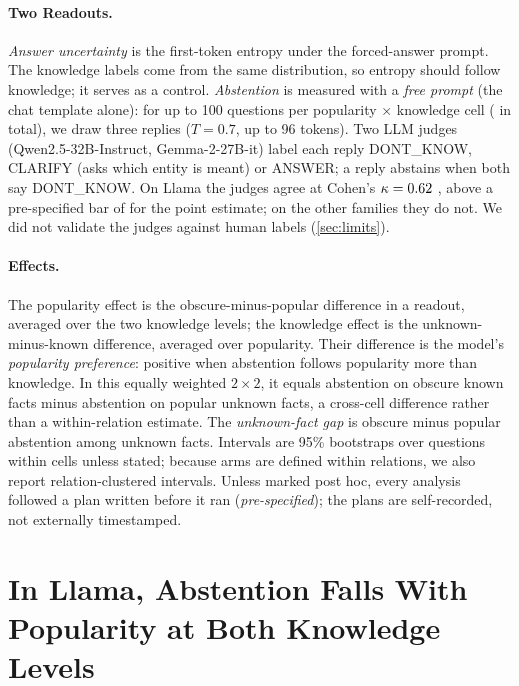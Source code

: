 \documentclass[manuscript,screen,review,anonymous,nonacm]{acmart}
\begin{document}
\paragraph{Two Readouts.} \emph{Answer uncertainty} is the first-token entropy under the forced-answer prompt. The knowledge labels come from the same distribution, so entropy should follow knowledge; it serves as a control. \emph{Abstention} is measured with a \emph{free prompt} (the chat template alone): for up to 100 questions per popularity $\times$ knowledge cell (\hmLlamaItems{} in total), we draw three replies ($T=0.7$, up to 96 tokens). Two LLM judges (Qwen2.5-32B-Instruct, Gemma-2-27B-it) label each reply DONT\_KNOW, CLARIFY (asks which entity is meant) or ANSWER; a reply abstains when both say DONT\_KNOW. On Llama the judges agree at Cohen's $\kappa=0.62$ \lkKappaCI, above a pre-specified bar of \kappaBar{} for the point estimate; on the other families they do not. We did not validate the judges against human labels (\cref{sec:limits}).

\paragraph{Effects.} The popularity effect is the obscure-minus-popular difference in a readout, averaged over the two knowledge levels; the knowledge effect is the unknown-minus-known difference, averaged over popularity. Their difference is the model's \emph{popularity preference}: positive when abstention follows popularity more than knowledge. In this equally weighted $2\times2$, it equals abstention on obscure known facts minus abstention on popular unknown facts, a cross-cell difference rather than a within-relation estimate. The \emph{unknown-fact gap} is obscure minus popular abstention among unknown facts. Intervals are 95\% bootstraps over questions within cells unless stated; because arms are defined within relations, we also report relation-clustered intervals. Unless marked post hoc, every analysis followed a plan written before it ran (\emph{pre-specified}); the plans are self-recorded, not externally timestamped.

\section{In Llama, Abstention Falls With Popularity at Both Knowledge Levels}
\label{sec:main}
\end{document}
